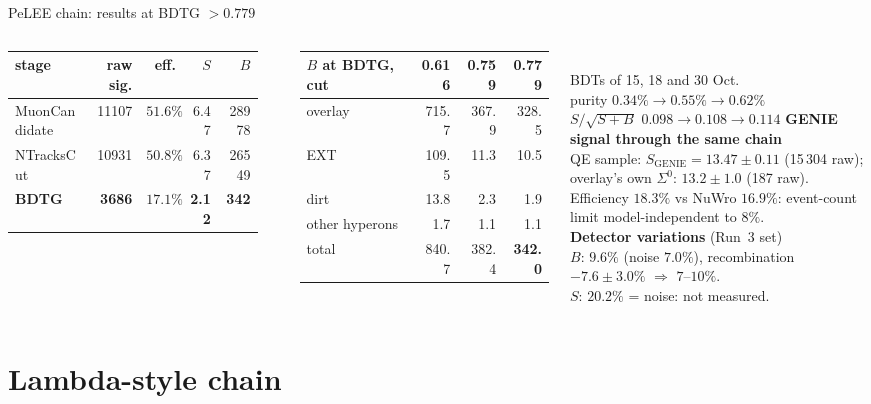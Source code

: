 \documentclass[aspectratio=169,10pt]{beamer}
\newcommand{\Szero}{\ensuremath{\Sigma^{0}}}
\begin{document}
\begin{frame}{PeLEE chain: results at BDTG $>0.779$}
  \begin{columns}[T]
  \footnotesize
  \begin{tabular}{lrrrr}
    \toprule
    stage & raw sig. & eff. & $S$ & $B$ \\
    \midrule
    MuonCandidate & 11107 & $51.6\%$ & 6.47 & 28978 \\
    NTracksCut    & 10931 & $50.8\%$ & 6.37 & 26549 \\
    \textbf{BDTG} & \textbf{3686} & $\mathbf{17.1\%}$ & \textbf{2.12} & \textbf{342} \\
    \bottomrule
  \end{tabular}\\[6pt]
  \begin{tabular}{lrrr}
    \toprule
    $B$ at BDTG, cut & 0.616 & 0.759 & \textbf{0.779} \\
    \midrule
    overlay & 715.7 & 367.9 & 328.5 \\
    EXT     & 109.5 & 11.3  & 10.5 \\
    dirt    & 13.8  & 2.3   & 1.9 \\
    other hyperons & 1.7 & 1.1 & 1.1 \\
    \midrule
    total   & 840.7 & 382.4 & \textbf{342.0} \\
    \bottomrule
  \end{tabular}\\[4pt]
  BDTs of 15, 18 and 30 Oct.\\
  purity $0.34\%\to0.55\%\to\mathbf{0.62\%}$\\
  $S/\sqrt{S+B}$ $0.098\to0.108\to\mathbf{0.114}$
  \small
  \textbf{GENIE signal through the same chain}\\
  QE sample: $S_{\mathrm{GENIE}}=13.47\pm0.11$ (15\,304 raw); overlay's own \Szero:
  $13.2\pm1.0$ (187 raw). Efficiency $18.3\%$ vs NuWro $16.9\%$: event-count limit
  model-independent to $8\%$.\\[6pt]
  \textbf{Detector variations} (Run~3 set)\\
  $B$: $9.6\%$ (noise $7.0\%$), recombination $-7.6\pm3.0\%$ $\Rightarrow$ $7$--$10\%$.\\
  $S$: $20.2\%$ = noise: not measured.
  \end{columns}
\end{frame}

\section{Lambda-style chain}
\end{document}
